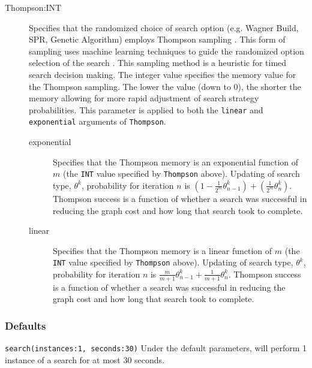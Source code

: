 \begin{description}
		\item[Thompson:INT] Specifies that the randomized choice of search option (e.g. 
		Wagner Build, SPR, Genetic Algorithm) employs Thompson sampling 
		\citep{Thompson1933}. This form of sampling uses machine learning techniques 
		to guide the randomized option selection of the search \citep{WheelerThompson}. 
		This sampling method is a heuristic for timed search decision making. The integer 
		value specifies the memory value for the Thompson sampling. The lower the value 
		(down to 0), the shorter the memory allowing for more rapid adjustment of search 
		strategy probabilities. This parameter is applied to both the \texttt{linear} and 
		\texttt{exponential} arguments of \texttt{Thompson}.
			
		\begin{description}
		
			\item[exponential] Specifies that the Thompson memory is an exponential function of 
			$m$ (the \texttt{INT} value specified by \texttt{Thompson} above). Updating of search 
			type, $\theta^k$, probability for iteration $n$ is $ \left(1 - \frac{1}{2^m} \theta^k_{n-1}\right) 
			+ \left(\frac{1}{2^m} \theta^k_n \right)$. Thompson success is a function of whether a 
			search was successful in reducing the graph cost and how long that search took to 
			complete.
			
			\item[linear] Specifies that the Thompson memory is a linear function of $m$ (the 
			\texttt{INT} value specified by \texttt{Thompson} above). Updating of search type, $\theta^k$, 
			probability for iteration $n$ is $\frac{m}{m+1} \theta^k_{n-1} + \frac{1}{m+1} \theta^k_n$. 
			Thompson success is a function of whether a search was successful in reducing the graph 
			cost and how long that search took to complete.

		\end{description}
		
	\end{description}		
	
	\subsubsection{Defaults}
		\texttt{search(instances:1, seconds:30)} Under the default parameters, \phyg will 
		perform 1 instance of a search for at most 30 seconds.
		

